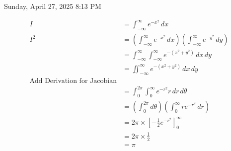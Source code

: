 \documentclass{article}
\begin{document}
Sunday, April 27, 2025 \hfill 8:13 PM

\begin{align*}
I &= \int_{-\infty}^{\infty} e^{-x^2} \, dx \\
I^2 &= \left( \int_{-\infty}^{\infty} e^{-x^2} \, dx \right) \left( \int_{-\infty}^{\infty} e^{-y^2} \, dy \right) \\
&= \int_{-\infty}^{\infty} \int_{-\infty}^{\infty} e^{-(x^2 + y^2)} \, dx \, dy \\
&= \iint_{-\infty}^{\infty} e^{-(x^2 + y^2)} \, dx \, dy \\
\text{Add Derivation for Jacobian} \\
&= \int_0^{2\pi} \int_0^{\infty} e^{-r^2} r \, dr \, d\theta \\
&= \left( \int_0^{2\pi} d\theta \right) \left( \int_0^{\infty} r e^{-r^2} \, dr \right) \\
&= 2\pi \times \left[ -\frac{1}{2} e^{-r^2} \right]_0^{\infty} \\
&= 2\pi \times \frac{1}{2} \\
&= \pi
\end{align*}
\end{document}
